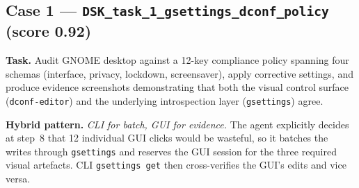 \documentclass{llmxive}
\begin{document}
\subsection{Case 1 --- \texttt{DSK\_task\_1\_gsettings\_dconf\_policy} (score 0.92)}
\label{app:case-dconf}

\textbf{Task.} Audit GNOME desktop against a 12-key compliance policy spanning four schemas (interface, privacy, lockdown, screensaver), apply corrective settings, and produce evidence screenshots demonstrating that both the visual control surface (\texttt{dconf-editor}) and the underlying introspection layer (\texttt{gsettings}) agree.

\textbf{Hybrid pattern.} \emph{CLI for batch, GUI for evidence.} The agent explicitly decides at step~8 that 12 individual GUI clicks would be wasteful, so it batches the writes through \texttt{gsettings} and reserves the GUI session for the three required visual artefacts. CLI \texttt{gsettings get} then cross-verifies the GUI's edits and vice versa.
\end{document}
